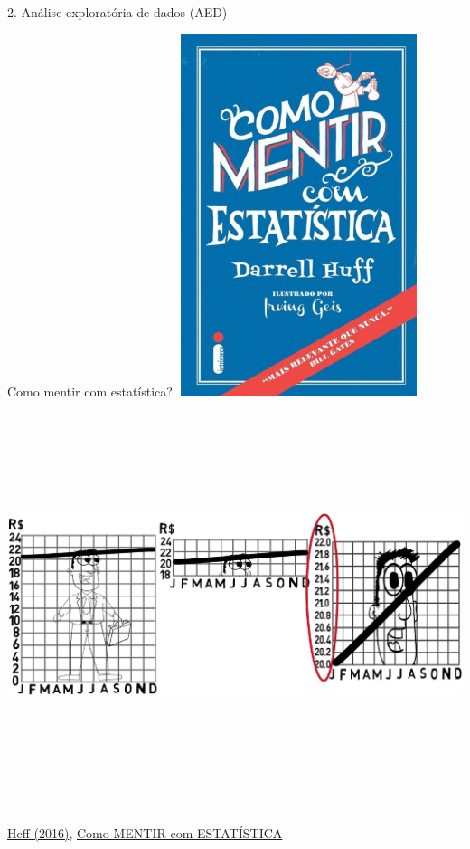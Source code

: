 \documentclass[
  ignorenonframetext,
]{beamer}
\begin{document}
\begin{frame}[fragile]{2. Análise exploratória de dados (AED)}
\begin{block}{Como mentir com estatística?}
\protect\hypertarget{como-mentir-com-estatuxedstica}{}
\includegraphics[width=2.8125in,height=4.16667in]{img/cover_mentir_estatistica.jpg}
\includegraphics[width=9.375in,height=4.6875in]{img/como_mentir_est.png}

\href{https://www.intrinseca.com.br/livro/624/}{Heff (2016)},
\href{https://youtu.be/r6d-RBDlc5I}{Como MENTIR com ESTATÍSTICA}
\end{block}


\end{frame}
\end{document}
